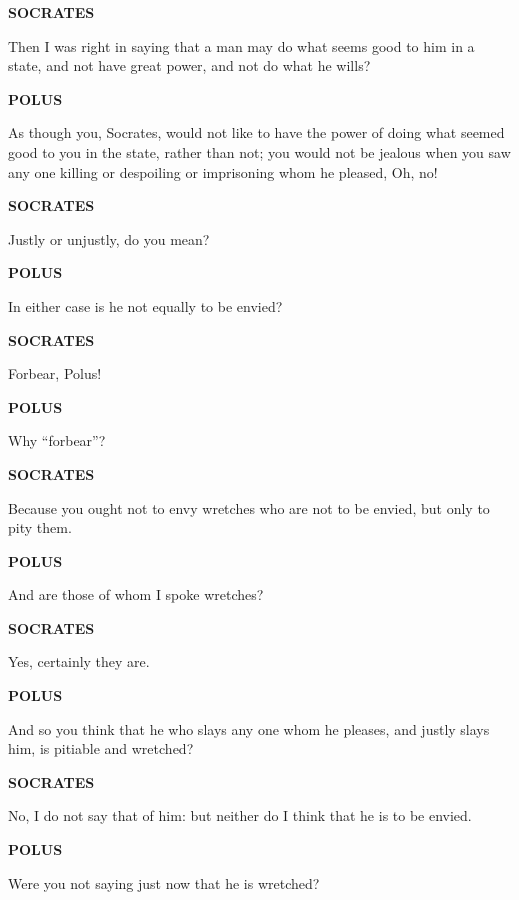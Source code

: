 \documentclass[11pt,letter]{article}
\begin{document}
\par \textbf{SOCRATES}
\par   Then I was right in saying that a man may do what seems good to him in a state, and not have great power, and not do what he wills?

\par \textbf{POLUS}
\par   As though you, Socrates, would not like to have the power of doing what seemed good to you in the state, rather than not; you would not be jealous when you saw any one killing or despoiling or imprisoning whom he pleased, Oh, no!

\par \textbf{SOCRATES}
\par   Justly or unjustly, do you mean?

\par \textbf{POLUS}
\par   In either case is he not equally to be envied?

\par \textbf{SOCRATES}
\par   Forbear, Polus!

\par \textbf{POLUS}
\par   Why “forbear”?

\par \textbf{SOCRATES}
\par   Because you ought not to envy wretches who are not to be envied, but only to pity them.

\par \textbf{POLUS}
\par   And are those of whom I spoke wretches?

\par \textbf{SOCRATES}
\par   Yes, certainly they are.

\par \textbf{POLUS}
\par   And so you think that he who slays any one whom he pleases, and justly slays him, is pitiable and wretched?

\par \textbf{SOCRATES}
\par   No, I do not say that of him:  but neither do I think that he is to be envied.

\par \textbf{POLUS}
\par   Were you not saying just now that he is wretched?
\end{document}

